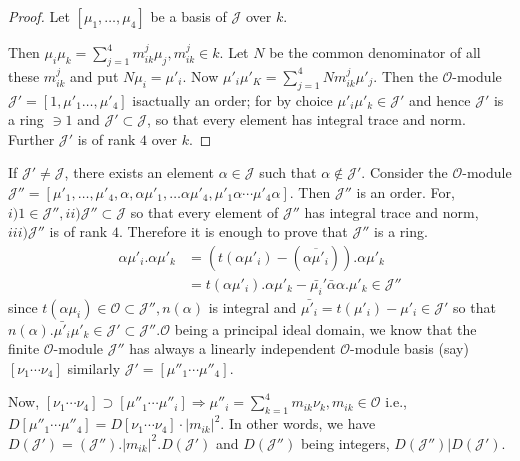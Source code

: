 \begin{proof}
  Let $[\mu_1, \ldots,  \mu_4]$ be a basis of $\mathcal{J}$ over $k$.

  Then $\mu_i \mu_k = \sum \limits^{4}_{j=1} m_{ik}^j \mu_j,   m_{ik}^j
  \in k$. Let $N$ be the common denominator of all these $m_{ik}^{j}$
  and put $N \mu_i = \mu'_i$. Now $\mu'_i \mu'_K = \sum
  \limits^{4}_{j=1} N m_{ik}^{j} \mu'_j$. Then the $\mathscr{O}$-module
  $\mathcal{J}' = [1, \mu'_1  \ldots,  \mu'_4]$ is\pageoriginale actually an order;
  for by choice $\mu'_i \mu'_k \in \mathcal{J}'$ and hence
  $\mathcal{J}'$ is a ring $\ni 1$ and $\mathcal{J}' \subset
  \mathcal{J}$, so that every element has integral trace and
  norm. Further $\mathcal{J}'$ is of rank $4$ over $k$. 
\end{proof}

If $\mathcal{J}' \neq \mathcal{J}$, there exists an element $\alpha
\in \mathcal{J}$ such that $\alpha \notin \mathcal{J}'$. Consider the
$\mathscr{O}$-module $\mathcal{J}'' = [\mu'_1, \ldots,  \mu'_4,
  \alpha,  \alpha \mu'_1, \ldots \alpha \mu'_4,  \mu'_1 \alpha \cdots
  \mu'_4 \alpha]$.  Then $\mathcal{J}''$ is an order. For, $i) 1 \in
\mathcal{J}'', ii) \mathcal{J}'' \subset \mathcal{J}$ so that every
element of $\mathcal{J}''$ has integral trace and norm, $iii)
\mathcal{J}''$ is of rank $4$. Therefore it is enough to prove that
$\mathcal{J}''$ is a ring. 
\begin{align*}
  \alpha \mu'_i .  \alpha \mu'_k  & = (t(\alpha \mu'_i) -
  (\overline{\alpha \mu'_i})). \alpha \mu'_k\\ 
  & = t(\alpha \mu'_i).  \alpha \mu'_k - \bar{\mu_i}' \bar{\alpha}
  \alpha.  \mu'_k \in \mathcal{J}'' 
\end{align*}
since $t(\alpha \mu_i) \in \mathscr{O} \subset \mathcal{J}'',
n(\alpha)$ is integral and $\bar{\mu'_i} = t(\mu'_i)- \mu'_i \in
\mathcal{J}'$ so that $n(\alpha). \bar{\mu'_i} \mu'_k \in \mathcal{J}'
\subset \mathcal{J}''. \mathscr{O}$ being a principal ideal domain, we
know that the finite $\mathscr{O}$-module $\mathcal{J}''$ has always a
linearly independent $\mathscr{O}$-module basis (say) $[\nu_1 \cdots
  \nu_4]$ similarly $\mathcal{J}' = [\mu''_1 \cdots \mu''_4]$. 

Now, $[\nu_1 \cdots  \nu_4] \supset [\mu''_1  \cdots \mu''_i]
\Rightarrow \mu''_i = \sum \limits_{k=1}^{4} m_{ik} \nu_k,  m_{ik} \in
\mathscr{O}$ i.e., $D[\mu''_1 \cdots \mu''_4] = D [\nu_1 \cdots
  \nu_4]\cdot |m_{ik}|^2$. In other words, we have $D(\mathcal{J}') =
(\mathcal{J}''). |m_{ik}|^2. D (\mathcal{J}')$ and $D(\mathcal{J}'')$
being integers, $D(\mathcal{J}'') |D(\mathcal{J}')$. 

